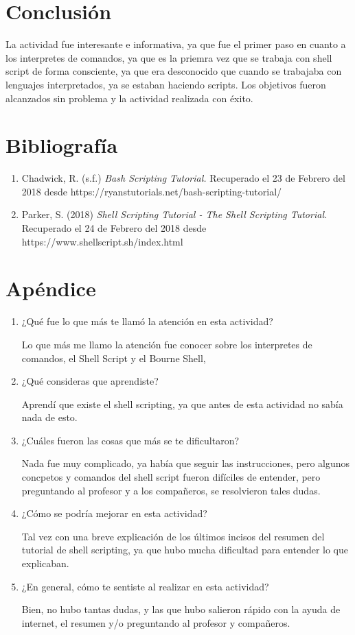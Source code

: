 \documentclass[a4paper]{article}
\begin{document}
\section{Conclusión}
La actividad fue interesante e informativa, ya que fue el primer paso en cuanto a los interpretes de comandos, ya que es la priemra vez que se trabaja con shell script de forma consciente, ya que era desconocido que cuando se trabajaba con lenguajes interpretados, ya se estaban haciendo scripts. Los objetivos fueron alcanzados sin problema y la actividad realizada con éxito. 


\section{Bibliografía}
\begin{enumerate}
\item Chadwick, R. (s.f.) \textit{Bash Scripting Tutorial.} Recuperado el 23 de Febrero del 2018 desde https://ryanstutorials.net/bash-scripting-tutorial/

\item Parker, S. (2018) \textit{Shell Scripting Tutorial - The Shell Scripting Tutorial.} Recuperado el 24 de Febrero del 2018 desde https://www.shellscript.sh/index.html
\end{enumerate}

\section{Apéndice}
\begin{enumerate}
\item ¿Qué fue lo que más te llamó la atención en esta actividad?

Lo que más me llamo la atención fue conocer sobre los interpretes de comandos, el Shell Script y el Bourne Shell, 

\item ¿Qué consideras que aprendiste?

Aprendí que existe el shell scripting, ya que antes de esta actividad no sabía nada de esto. 

\item ¿Cuáles fueron las cosas que más se te dificultaron?

Nada fue muy complicado, ya había que seguir las instrucciones, pero algunos concpetos y comandos del shell script fueron difíciles de entender, pero preguntando al profesor y a los compañeros, se resolvieron tales dudas.

\item ¿Cómo se podría mejorar en esta actividad?

Tal vez con una breve explicación de los últimos incisos del resumen del tutorial de shell scripting, ya que hubo mucha dificultad para entender lo que explicaban. 


\item ¿En general, cómo te sentiste al realizar en esta actividad? 

Bien, no hubo tantas dudas, y las que hubo salieron rápido con la ayuda de internet, el resumen y/o preguntando al profesor y compañeros.

\end{enumerate}
\end{document}
